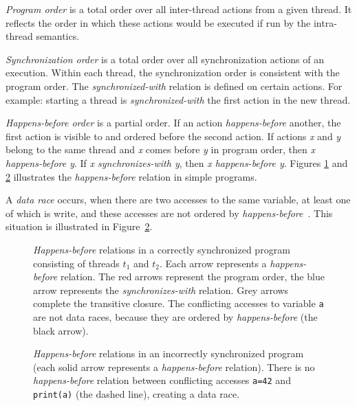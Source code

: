 \emph{Program order} is a total order over all inter-thread actions from a given
thread. It reflects the order in which these actions would be executed if
run by the intra-thread semantics.

\emph{Synchronization order} is a total order over all synchronization actions
of an execution. Within each thread, the synchronization order is consistent
with the program order. The \emph{synchronized-with} relation is defined on
certain actions. For example: starting a thread is \emph{synchronized-with}
the first action in the new thread.

\emph{Happens-before order} is a partial order. If an action
\emph{happens-before} another, the first action is visible to and ordered before
the second action. If actions \emph{x} and \emph{y} belong to the same thread
and \emph{x} comes before \emph{y} in program order, then \emph{x happens-before
y}.  If \emph{x synchronizes-with y}, then \emph{x happens-before y}. Figures
\ref{hb1} and \ref{hb2} illustrates the \emph{happens-before} relation in simple
programs.

A \emph{data race} occurs, when there are two accesses to the same variable, at
least one of which is write, and these accesses are not ordered by
\emph{happens-before}~\cite{jmmspec}. This situation is illustrated in
Figure~\ref{hb2}.

\begin{figure}[hbt]
    \label{hb1}
    
    \caption{\emph{Happens-before} relations in a correctly synchronized program
    consisting of threads $t_1$ and $t_2$. Each arrow represents a
    \emph{happens-before} relation. The red arrows represent the program order,
    the blue arrow represents the \emph{synchronizes-with} relation. Grey arrows
    complete the transitive closure. The conflicting accesses to variable
    \texttt{a} are not data races, because they are ordered by
    \emph{happens-before} (the black arrow).}
\end{figure}

\begin{figure}[hbt]
    \label{hb2}
    
    \caption{\emph{Happens-before} relations in an incorrectly synchronized
    program (each solid arrow represents a \emph{happens-before} relation).
    There is no \emph{happens-before} relation between conflicting accesses
    \texttt{a=42} and \texttt{print(a)} (the dashed line), creating a data
    race.}
\end{figure}


